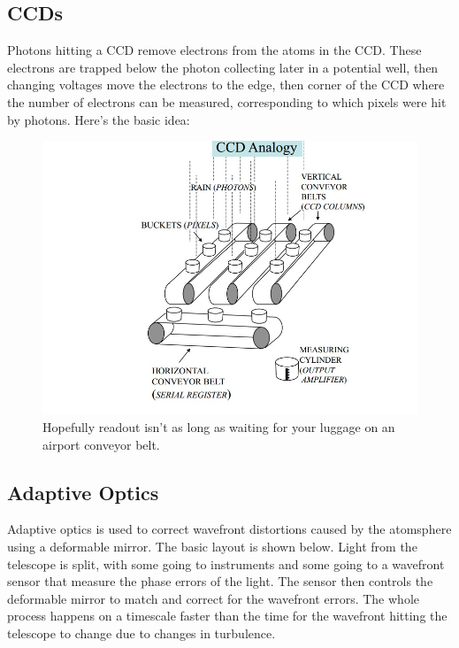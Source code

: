 \subsection{CCDs}
Photons hitting a CCD remove electrons from the atoms in the CCD.  These 
electrons are trapped below the photon collecting later in a potential well, 
then changing voltages move the electrons to the edge, then corner of the 
CCD where the number of electrons can be measured, corresponding to which 
pixels were hit by photons.  Here's the basic idea:

\begin{figure}[!h]
\begin{center}
\includegraphics[width=\textwidth]{CCD.jpg}
\end{center}
\caption{Hopefully readout isn't as long as waiting for your luggage on an 
airport conveyor belt.
\label{fig:CCD}}
\end{figure}

\subsection{Adaptive Optics}
Adaptive optics is used to correct wavefront distortions caused by the 
atomsphere using a deformable mirror.  The basic layout is shown below.  Light 
from the telescope is split, with some going to instruments and some going 
to a wavefront sensor that measure the phase errors of the light.  The 
sensor then controls the deformable mirror to match and correct for the 
wavefront errors.  The whole process happens on a timescale faster than 
the time for the wavefront hitting the telescope to change due to changes in 
turbulence.  

